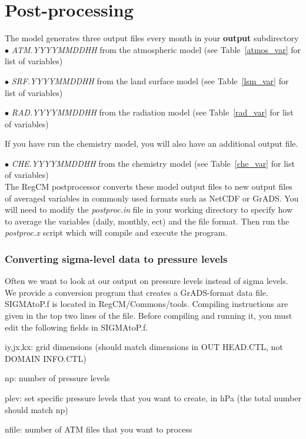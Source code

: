 \newpage
\section{Post-processing}
The model generates three output files every month in your {\bf output} subdirectory \\

$\bullet$  {\it ATM.YYYYMMDDHH} from the atmospheric model (see Table~\ref{atmos_var} 
for list of variables)

$\bullet$  {\it SRF.YYYYMMDDHH} from the land surface model (see Table~\ref{lsm_var} 
for list of variables)

$\bullet$  {\it RAD.YYYYMMDDHH} from the radiation model (see Table~\ref{rad_var} 
for list of variables)

If you have run the chemistry model, you will also have an additional output file.

$\bullet$  {\it CHE.YYYYMMDDHH} from the chemistry model (see Table~\ref{che_var} 
for list of variables)\\

The RegCM postprocessor converts these model output files to new output files of 
averaged variables in commonly used formats such as NetCDF or GrADS.  You will 
need to modify the {\it postproc.in} file in your working directory to specify how
to average the variables (daily, monthly, ect) and the file format.  Then run 
the {\it postproc.x} script which will compile and execute the program.

\subsubsection{Converting sigma-level data to pressure levels}
Often we want to look at our output on pressure levels instead of sigma levels. We provide a conversion program that creates a GrADS-format data file. SIGMAtoP.f is located in RegCM/Commons/tools. Compiling instructions are given in the top two lines of the file. Before compiling and running it, you must edit the following fields in SIGMAtoP.f. 

iy,jx,kx: grid dimensions (should match dimensions in OUT HEAD.CTL, not DOMAIN INFO.CTL)

np: number of pressure levels

plev: set specific pressure levels that you want to create, in hPa (the total number should match np)

nfile: number of ATM files that you want to process

